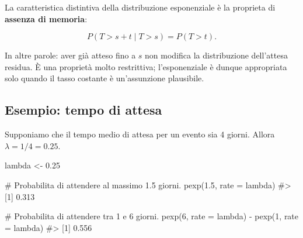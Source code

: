\documentclass[
  italian,
  letterpaper,
  a4paper,
  11pt,
  open=any]{scrbook}
\newenvironment{Shaded}{\begin{snugshade}}{\end{snugshade}}
\newcommand{\AttributeTok}[1]{\textcolor[rgb]{0.40,0.45,0.13}{#1}}
\newcommand{\CommentTok}[1]{\textcolor[rgb]{0.37,0.37,0.37}{#1}}
\newcommand{\DecValTok}[1]{\textcolor[rgb]{0.68,0.00,0.00}{#1}}
\newcommand{\FloatTok}[1]{\textcolor[rgb]{0.68,0.00,0.00}{#1}}
\newcommand{\FunctionTok}[1]{\textcolor[rgb]{0.28,0.35,0.67}{#1}}
\newcommand{\NormalTok}[1]{\textcolor[rgb]{0.00,0.23,0.31}{#1}}
\newcommand{\OtherTok}[1]{\textcolor[rgb]{0.00,0.23,0.31}{#1}}
\newcommand{\SpecialCharTok}[1]{\textcolor[rgb]{0.37,0.37,0.37}{#1}}
\theoremstyle{plain}
\theoremstyle{definition}
\theoremstyle{definition}
\theoremstyle{remark}
\begin{document}
La caratteristica distintiva della distribuzione esponenziale è la
proprieta di \textbf{assenza di memoria}:

\[
P(T > s+t \mid T > s) = P(T > t).
\]

In altre parole: aver già atteso fino a \(s\) non modifica la
distribuzione dell'attesa residua. È una proprietà molto restrittiva;
l'esponenziale è dunque appropriata solo quando il tasso costante è
un'assunzione plausibile.

\subsection{Esempio: tempo di attesa}\label{esempio-tempo-di-attesa}

Supponiamo che il tempo medio di attesa per un evento sia 4 giorni.
Allora \(\lambda = 1/4 = 0.25\).

\begin{Shaded}
\begin{Highlighting}[]
\NormalTok{lambda }\OtherTok{\textless{}{-}} \FloatTok{0.25}

\CommentTok{\# Probabilita di attendere al massimo 1.5 giorni.}
\FunctionTok{pexp}\NormalTok{(}\FloatTok{1.5}\NormalTok{, }\AttributeTok{rate =}\NormalTok{ lambda)}
\CommentTok{\#\textgreater{} [1] 0.313}

\CommentTok{\# Probabilita di attendere tra 1 e 6 giorni.}
\FunctionTok{pexp}\NormalTok{(}\DecValTok{6}\NormalTok{, }\AttributeTok{rate =}\NormalTok{ lambda) }\SpecialCharTok{{-}} \FunctionTok{pexp}\NormalTok{(}\DecValTok{1}\NormalTok{, }\AttributeTok{rate =}\NormalTok{ lambda)}
\CommentTok{\#\textgreater{} [1] 0.556}
\end{Highlighting}
\end{Shaded}
\end{document}
